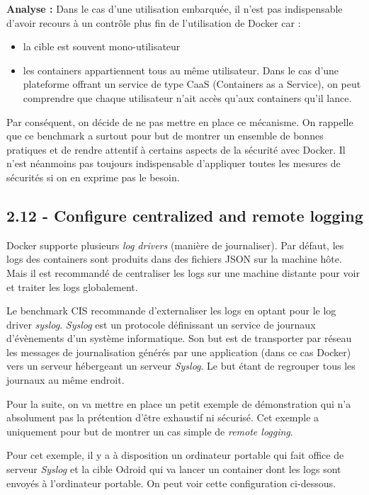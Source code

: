 \documentclass[11pt,a4paper,oneside]{report}
\begin{document}
\textbf{Analyse : } Dans le cas d'une utilisation embarquée, il n'est pas indispensable d'avoir recours à un contrôle plus fin de l'utilisation de Docker car :
\begin{itemize}
\item la cible est souvent mono-utilisateur
\item les containers appartiennent tous au même utilisateur. Dans le cas d'une plateforme offrant un service de type CaaS (Containers as a Service), on peut comprendre que chaque utilisateur n'ait accès qu'aux containers qu'il lance.
\end{itemize}
Par conséquent, on décide de ne pas mettre en place ce mécanisme. On rappelle que ce benchmark a surtout pour but de montrer un ensemble de bonnes pratiques et de rendre attentif à certains aspects de la sécurité avec Docker. Il n'est néanmoins pas toujours indispensable d'appliquer toutes les mesures de sécurités si on en exprime pas le besoin.


\subsection{2.12 - Configure centralized and remote logging}
Docker supporte plusieurs \textit{log drivers} (manière de journaliser). Par défaut, les logs des containers sont produits dans des fichiers JSON sur la machine hôte. Mais il est recommandé de centraliser les logs sur une machine distante pour voir et traiter les logs globalement.

Le benchmark CIS recommande d'externaliser les logs en optant pour le log driver \textit{syslog}. \textit{Syslog}\cite{developpez_syslog}\cite{wiki_syslog} est un protocole définissant un service de journaux d'évènements d'un système informatique. Son but est de transporter par réseau les messages de journalisation générés par une application (dans ce cas Docker) vers un serveur hébergeant un serveur \textit{Syslog}. Le but étant de regrouper tous les journaux au même endroit.

Pour la suite, on va mettre en place un petit exemple de démonstration qui n'a absolument pas la prétention d'être exhaustif ni sécurisé. Cet exemple a uniquement pour but de montrer un cas simple de \textit{remote logging}.

Pour cet exemple, il y a à disposition un ordinateur portable qui fait office de serveur \textit{Syslog} et la cible Odroid qui va lancer un container dont les logs sont envoyés à l'ordinateur portable. On peut voir cette configuration ci-dessous.
\end{document}
